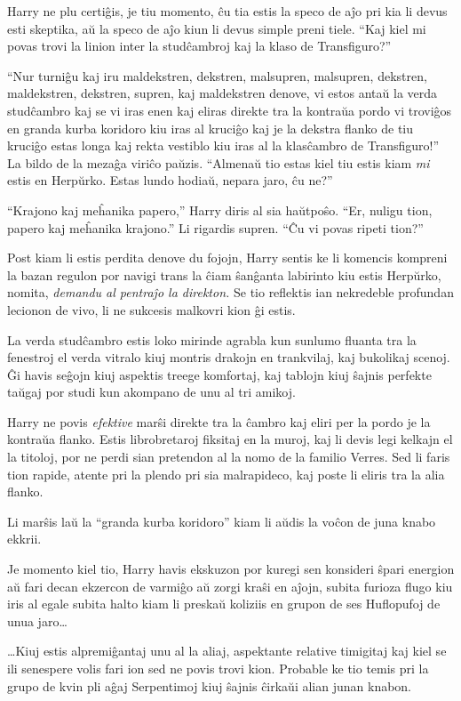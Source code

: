 Harry ne plu certiĝis, je tiu momento, ĉu tia estis la speco de aĵo pri kia li
devus esti skeptika, aŭ la speco de aĵo kiun li devus simple preni tiele. ``Kaj
kiel mi povas trovi la linion inter la studĉambroj kaj la klaso de
Transfiguro?''

``Nur turniĝu kaj iru maldekstren, dekstren, malsupren, malsupren, dekstren,
maldekstren, dekstren, supren, kaj maldekstren denove, vi estos antaŭ la verda
studĉambro kaj se vi iras enen kaj eliras direkte tra la kontraŭa pordo vi
troviĝos en granda kurba koridoro kiu iras al kruciĝo kaj je la dekstra flanko
de tiu kruciĝo estas longa kaj rekta vestiblo kiu iras al la klasĉambro de
Transfiguro!'' La bildo de la mezaĝa viriĉo paŭzis. ``Almenaŭ tio estas kiel tiu
estis kiam \emph{mi} estis en Herpŭrko. Estas lundo hodiaŭ, nepara jaro, ĉu
ne?''

``Krajono kaj meĥanika papero,'' Harry diris al sia haŭtpoŝo. ``Er,
nuligu tion, papero kaj meĥanika krajono.'' Li rigardis supren. ``Ĉu
vi povas ripeti tion?''

Post kiam li estis perdita denove du fojojn, Harry sentis ke li komencis kompreni la bazan
regulon por navigi trans la ĉiam ŝanĝanta labirinto kiu estis Herpŭrko, nomita,
\emph{demandu al pentraĵo la direkton.} Se tio reflektis ian nekredeble profundan
lecionon de vivo, li ne sukcesis malkovri kion ĝi estis.

La verda studĉambro estis loko mirinde agrabla kun sunlumo fluanta tra
la fenestroj el verda vitralo kiuj montris drakojn en trankvilaj, kaj
bukolikaj scenoj. Ĝi havis seĝojn kiuj aspektis treege komfortaj, kaj
tablojn kiuj ŝajnis perfekte taŭgaj por studi kun akompano de unu al
tri amikoj. 

Harry ne povis \emph{efektive} marŝi direkte tra la ĉambro kaj eliri per la
pordo je la kontraŭa flanko. Estis librobretaroj fiksitaj en la muroj, kaj li
devis legi kelkajn el la titoloj, por ne perdi sian pretendon al la nomo de la
familio Verres. Sed li faris tion rapide, atente pri la plendo pri sia
malrapideco, kaj poste li eliris tra la alia flanko.

Li marŝis laŭ la ``granda kurba koridoro'' kiam li aŭdis la voĉon de
juna knabo ekkrii.

Je momento kiel tio, Harry havis ekskuzon por kuregi sen konsideri ŝpari
energion aŭ fari decan ekzercon de varmiĝo aŭ zorgi kraŝi en aĵojn, subita
furioza flugo kiu iris al egale subita halto kiam li preskaŭ koliziis en
grupon de ses Huflopufoj de unua jaro\ldots

\ldots Kiuj estis alpremiĝantaj unu al la aliaj, aspektante relative timigitaj
kaj kiel se ili senespere volis fari ion sed ne povis trovi kion. Probable ke
tio temis pri la grupo de kvin pli aĝaj Serpentimoj kiuj ŝajnis ĉirkaŭi alian
junan knabon.

